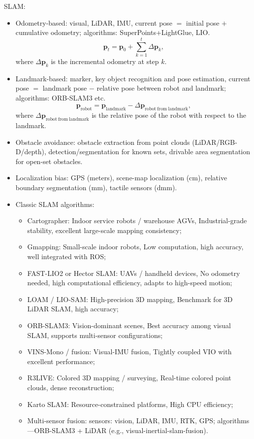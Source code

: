 \documentclass[12pt,a4paper]{article}
\begin{document}
SLAM:
\begin{itemize}
\item Odometry-based: visual, LiDAR, IMU, current pose $=$ initial pose $+$ cumulative odometry; algorithms: SuperPoints+LightGlue, LIO.
\begin{equation}
\mathbf{p}_{t}=\mathbf{p}_{0}+\sum_{k=1}^{t}\Delta\mathbf{p}_{k},
\label{eq:slam-odometry}
\end{equation}
where $\Delta\mathbf{p}_k$ is the incremental odometry at step $k$.
\item Landmark-based: marker, key object recognition and pose estimation, current pose $=$ landmark pose $-$ relative pose between robot and landmark; algorithms: ORB-SLAM3 etc.
\begin{equation}
\mathbf{p}_{\mathrm{robot}}=\mathbf{p}_{\mathrm{landmark}}-\Delta\mathbf{p}_{\mathrm{robot\ from\ landmark}},
\label{eq:slam-landmark}
\end{equation}
where $\Delta\mathbf{p}_{\mathrm{robot\ from\ landmark}}$ is the relative pose of the robot with respect to the landmark.
\item Obstacle avoidance: obstacle extraction from point clouds (LiDAR/RGB-D/depth), detection/segmentation for known sets, drivable area segmentation for open-set obstacles.
\item Localization bias: GPS (meters), scene-map localization (cm), relative boundary segmentation (mm), tactile sensors (dmm).
\item Classic SLAM algorithms:
\begin{itemize}
\item Cartographer: Indoor service robots / warehouse AGVs, Industrial-grade stability, excellent large-scale mapping consistency;
\item Gmapping: Small-scale indoor robots, Low computation, high accuracy, well integrated with ROS;
\item FAST-LIO2 or Hector SLAM: UAVs / handheld devices, No odometry needed, high computational efficiency, adapts to high-speed motion;
\item LOAM / LIO-SAM: High-precision 3D mapping, Benchmark for 3D LiDAR SLAM, high accuracy;
\item ORB-SLAM3: Vision-dominant scenes, Best accuracy among visual SLAM, supports multi-sensor configurations;
\item VINS-Mono / fusion: Visual-IMU fusion, Tightly coupled VIO with excellent performance;
\item R3LIVE: Colored 3D mapping / surveying, Real-time colored point clouds, dense reconstruction;
\item Karto SLAM: Resource-constrained platforms, High CPU efficiency;
\item Multi-sensor fusion: sensors: vision, LiDAR, IMU, RTK, GPS; algorithms---ORB-SLAM3 + LiDAR (e.g., visual-inertial-slam-fusion).
\end{itemize}
\end{itemize}
\end{document}

